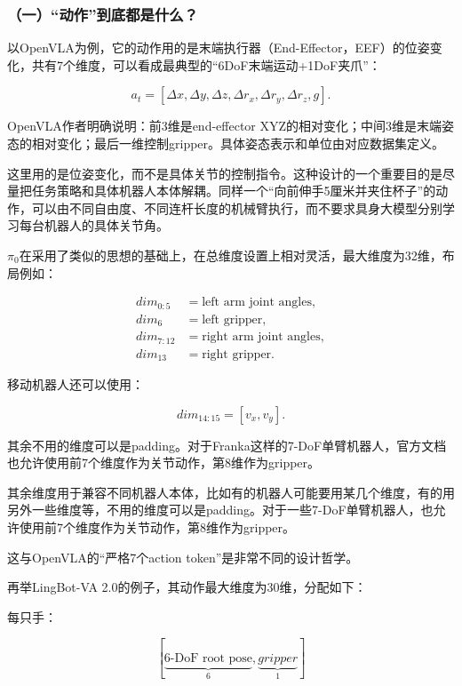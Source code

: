 \hypertarget{ux4e00ux52a8ux4f5cux5230ux5e95ux90fdux662fux4ec0ux4e48}{%
\subsubsection{（一）``动作''到底都是什么？}\label{ux4e00ux52a8ux4f5cux5230ux5e95ux90fdux662fux4ec0ux4e48}}

以OpenVLA为例，它的动作用的是末端执行器（End-Effector，EEF）的位姿变化，共有7个维度，可以看成最典型的``6DoF末端运动+1DoF夹爪''：

\[
a_t=[\Delta x,\Delta y,\Delta z,\Delta r_x,\Delta r_y,\Delta r_z,g].
\]

OpenVLA作者明确说明：前3维是end-effector XYZ的相对变化；中间3维是末端姿态的相对变化；最后一维控制gripper。具体姿态表示和单位由对应数据集定义。

这里用的是位姿变化，而不是具体关节的控制指令。这种设计的一个重要目的是尽量把任务策略和具体机器人本体解耦。同样一个``向前伸手5厘米并夹住杯子''的动作，可以由不同自由度、不同连杆长度的机械臂执行，而不要求具身大模型分别学习每台机器人的具体关节角。

\(\pi_0\)在采用了类似的思想的基础上，在总维度设置上相对灵活，最大维度为32维，布局例如：

\[
\begin{aligned}
\mathit{dim}_{0:5} &= \text{left arm joint angles},\\
\mathit{dim}_{6} &= \text{left gripper},\\
\mathit{dim}_{7:12} &= \text{right arm joint angles},\\
\mathit{dim}_{13} &= \text{right gripper}.
\end{aligned}
\]

移动机器人还可以使用：

\[
\mathit{dim}_{14:15}=[v_x,v_y].
\]

其余不用的维度可以是padding。对于Franka这样的7-DoF单臂机器人，官方文档也允许使用前7个维度作为关节动作，第8维作为gripper。

其余维度用于兼容不同机器人本体，比如有的机器人可能要用某几个维度，有的用另外一些维度等，不用的维度可以是padding。对于一些7-DoF单臂机器人，也允许使用前7个维度作为关节动作，第8维作为gripper。

这与OpenVLA的``严格7个action token''是非常不同的设计哲学。

再举LingBot-VA 2.0的例子，其动作最大维度为30维，分配如下：

每只手：

\[
[\underbrace{\text{6-DoF root pose}}_{6},\underbrace{\mathit{gripper}}_{1}]
\]

